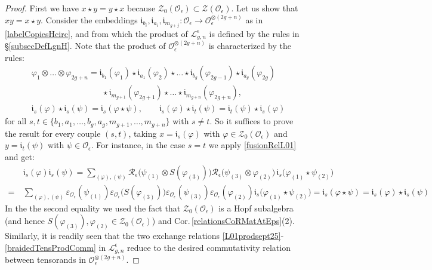 \documentclass[11pt]{amsart}
\newcommand{\e}{\epsilon}
\newcommand{\Oo}{\mathcal{O}}
\begin{document}
\begin{proof}
First we have $x \star y = y \star x$ because $\mathcal{Z}_0(\Oo_\e) \subset \mathcal{Z}(\Oo_\e)$. Let us show that $xy = x \star y$. Consider the embeddings $\mathfrak{i}_{b_i}, \mathfrak{i}_{a_i}, \mathfrak{i}_{m_{g+j}} : \Oo_\e \to \Oo_\e^{\otimes (2g+n)}$ as in \eqref{labelCopiesHcirc}, and from which the product of $\mathcal{L}_{g,n}^\e$ is defined by the rules in \S\ref{subsecDefLgnH}. Note that the product of $\Oo_\e^{\otimes (2g+n)}$ is characterized by the rules:
\begin{align*}
&\varphi_1 \otimes \ldots \otimes \varphi_{2g+n} = \mathfrak{i}_{b_1}(\varphi_1) \star \mathfrak{i}_{a_1}(\varphi_2) \star \ldots \star \mathfrak{i}_{b_g}(\varphi_{2g-1}) \star \mathfrak{i}_{a_g}(\varphi_{2g})\\
&\qquad\qquad\qquad\qquad\:\:\star \mathfrak{i}_{m_{g+1}}(\varphi_{2g+1}) \star \ldots \star \mathfrak{i}_{m_{g+n}}(\varphi_{2g+n}),\\
&\mathfrak{i}_s(\varphi)\star \mathfrak{i}_s(\psi) = \mathfrak{i}_s(\varphi \star \psi), \qquad \mathfrak{i}_s(\varphi) \star \mathfrak{i}_t(\psi) = \mathfrak{i}_t(\psi) \star \mathfrak{i}_s(\varphi)
\end{align*}
for all $s,t \in \bigl\{ b_1,a_1, \ldots, b_g,a_g,m_{g+1}, \ldots, m_{g+n} \bigr\}$ with $s\neq t$. So it suffices to prove the result for every couple $(s,t)$, taking $x = \mathfrak{i}_s(\varphi)$ with $\varphi \in \mathcal{Z}_0(\Oo_\e)$ and $y = \mathfrak{i}_t(\psi)$ with $\psi \in \Oo_\e$. For instance, in the case $s=t$ we apply \eqref{fusionRelL01} and get:
\begin{align*}
&\mathfrak{i}_s(\varphi)\mathfrak{i}_s(\psi) = \sum_{(\varphi),(\psi)}\mathcal{R}_{\e}\bigl( \psi_{(1)} \otimes S(\varphi_{(3)}) \bigr) \mathcal{R}_{\e}\bigl( \psi_{(3)} \otimes \varphi_{(2)} \bigr) \, \mathfrak{i}_s\bigl(\varphi_{(1)} \star \psi_{(2)} \bigr)\\
=\:&\sum_{(\varphi),(\psi)} \varepsilon_{\Oo_\e}(\psi_{(1)}) \varepsilon_{\Oo_\e}\bigl( S(\varphi_{(3)}) \bigr) \varepsilon_{\Oo_\e}(\psi_{(3)}) \varepsilon_{\Oo_\e}(\varphi_{(2)})\mathfrak{i}_s\bigl(\varphi_{(1)} \star \psi_{(2)} \bigr) = \mathfrak{i}_s(\varphi \star \psi)  = \mathfrak{i}_s(\varphi) \star \mathfrak{i}_s(\psi)
\end{align*}
In the the second equality we used the fact that $\mathcal{Z}_0(\Oo_\e)$ is a Hopf subalgebra (and hence $S(\varphi_{(3)}), \varphi_{(2)} \in \mathcal{Z}_0(\Oo_\e)$) and Cor.\,\ref{relationsCoRMatAtEps}(2). Similarly, it is readily seen that the two exchange relations \eqref{L01prodsept25}-\eqref{braidedTensProdComm} in $\mathcal{L}_{g,n}^\e$ reduce to the desired commutativity relation between tensorands in $\Oo_\e^{\otimes (2g+n)}$.

\end{proof}
\end{document}
